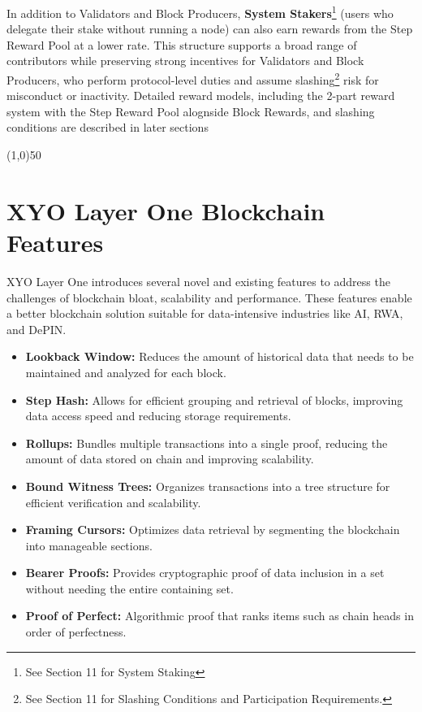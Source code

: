 \documentclass{article}
\begin{document}
In addition to Validators and Block Producers, \textbf{System Stakers}\footnote{See Section 11 for System Staking} (users who delegate their stake without running a node) can also earn rewards from the Step Reward Pool at a lower rate. This structure supports a broad range of contributors while preserving strong incentives for Validators and Block Producers, who perform protocol-level duties and assume slashing\footnote{See Section 11 for Slashing Conditions and Participation Requirements.} risk for misconduct or inactivity. Detailed reward models, including the 2-part reward system with the Step Reward Pool alognside Block Rewards, and slashing conditions are described in later sections


\begin{center}
    \line(1,0){50}
\end{center}

\section{XYO Layer One Blockchain Features}
XYO Layer One introduces several novel and existing features to address the challenges of blockchain bloat, scalability and performance. These features enable a better blockchain solution suitable for data-intensive industries like AI, RWA, and DePIN. 

\begin{itemize}
    \item \textbf{Lookback Window:} Reduces the amount of historical data that needs to be maintained and analyzed for each block. 
    \item \textbf{Step Hash:} Allows for efficient grouping and retrieval of blocks, improving data access speed and reducing storage requirements. 
    \item \textbf{Rollups:} Bundles multiple transactions into a single proof, reducing the amount of data stored on chain and improving scalability.
    \item \textbf{Bound Witness Trees:} Organizes transactions into a tree structure for efficient verification and scalability. 
    \item \textbf{Framing Cursors:} Optimizes data retrieval by segmenting the blockchain into manageable sections.
    \item \textbf{Bearer Proofs:} Provides cryptographic proof of data inclusion in a set without needing the entire containing set. 
    \item \textbf{Proof of Perfect:} Algorithmic proof that ranks items such as chain heads in order of perfectness.
\end{itemize}
\end{document}
